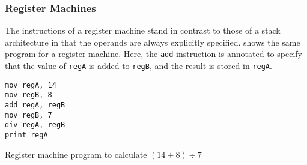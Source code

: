 			\subsubsection{Register Machines}
			The instructions of a register machine stand in contrast to those of a stack architecture in that the operands are always explicitly specified.  shows the same program for a register machine. Here, the \texttt{add} instruction is annotated to specify that the value of \texttt{regA} is added to \texttt{regB}, and the result is stored in \texttt{regA}.
			
			\begin{doublefig}
				\begin{halffig}
					\begin{lstlisting}
mov regA, 14
mov regB, 8
add regA, regB
mov regB, 7
div regA, regB
print regA
					\end{lstlisting}
					\caption{Register machine program to calculate $(14+8)\div7$}
					\label{fig:registerprogram}
				\end{halffig}
			\end{doublefig}
			
